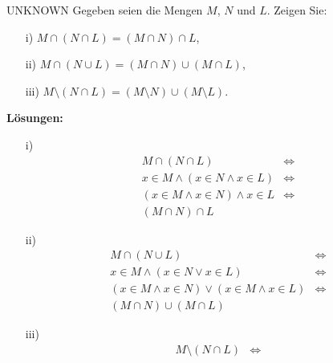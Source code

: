 \documentclass{problemset}
\author{Michael van Straten}
\begin{document}
\maketitle

\begin{problem}{UNKNOWN}
Gegeben seien die Mengen $M$, $N$ und $L$. Zeigen Sie:
\begin{enumerate}
    \item[i)] $M \cap (N \cap L) = (M \cap N) \cap L$,
    \item[ii)] $M \cap (N \cup L) = (M \cap N) \cup (M \cap L)$,
    \item[iii)] $M \setminus (N \cap L) = (M \setminus N) \cup (M \setminus
          L)$.
\end{enumerate}
\textbf{Lösungen:}
\begin{enumerate}
    \item[i)]
          \begin{align*}
              M \cap (N \cap L)                     & \Leftrightarrow \tag{Umformung zu Aussagenlogik}                \\
              x \in M \land (x \in N \land x \in L) & \Leftrightarrow \tag{Assoziativgesetze [LM21, Aufgabe 2.1 (a)]} \\
              (x \in M \land x \in N) \land x \in L & \Leftrightarrow \tag{Zurückformung zu Mengen}                   \\
              (M \cap N) \cap L
          \end{align*}
    \item[ii)]
          \begin{align*}
              M \cap (N \cup L)                                    & \Leftrightarrow \tag{Umformung zu Aussagenlogik}                 \\
              x \in M \land (x \in N \lor x \in L)                 & \Leftrightarrow \tag{Distributivgesetze [LM21, Aufgabe 2.1 (c)]} \\
              (x \in M \land x \in N) \lor (x \in M \land x \in L) & \Leftrightarrow \tag{Zurückformung zu Mengen}                    \\
              (M \cap N) \cup (M \cap L)
          \end{align*}
    \item[iii)]
          \begin{align*}
              M \setminus (N \cap L)                                     & \Leftrightarrow \tag{Umformung zu Aussagenlogik}                 \\

\end{align*}
\end{enumerate}
\end{problem}
\end{document}

